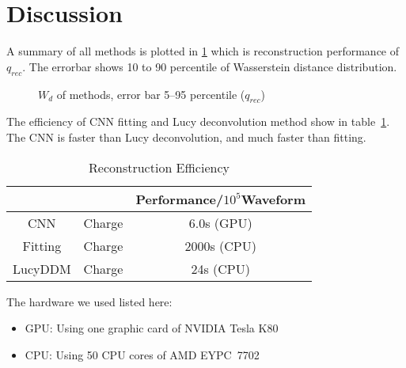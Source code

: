 \section{Discussion} %
\label{sec:discussion}

A summary of all methods is plotted in \ref{fig:chargesummary} which is reconstruction performance of $q_{rec}$. The errorbar shows 10 to 90 percentile of Wasserstein distance distribution. 

\begin{figure}[H]
    \centering
    \scalebox{0.35}{}
    \caption{\label{fig:chargesummary} $W_{d}$ of methods, error bar 5--95 percentile ($q_{rec}$)}
\end{figure}

The efficiency of CNN fitting and Lucy deconvolution method show in table~\ref{fig:efficiency}. The CNN is faster than Lucy deconvolution, and much faster than fitting. 

\begin{table}[H]
    \centering
    \caption{\label{fig:efficiency} Reconstruction Efficiency}
    \begin{tabular}{c|c|c}
        \hline
        & & Performance/$10^{5}$Waveform \\
        \hline
        CNN & Charge & 6.0s (GPU) \\
        \hline
        Fitting & Charge & 2000s (CPU) \\
        \hline
        LucyDDM & Charge & 24s (CPU) \\
        \hline
    \end{tabular}
\end{table}
\hspace{4mm}

The hardware we used listed here: 
\begin{center}
\begin{itemize}
    \item GPU: Using one graphic card of NVIDIA\textsuperscript{\textregistered} Tesla\textsuperscript{\textregistered} K80
    \item CPU: Using 50 CPU cores of AMD EYPC\texttrademark\ 7702
\end{itemize}
\end{center}

